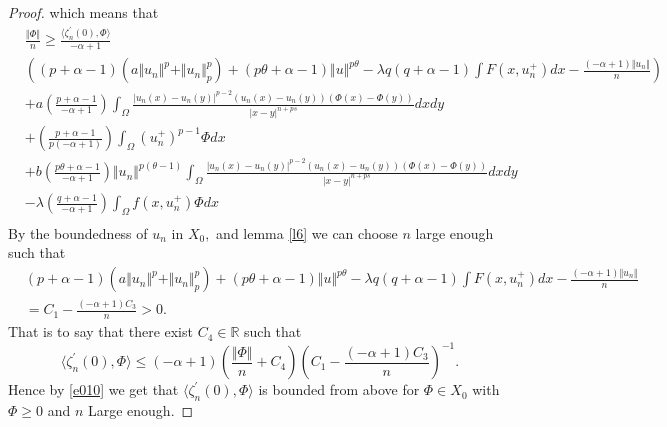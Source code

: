 \documentclass[10pt,a4paper]{amsart}
\begin{document}
\begin{proof}
{}
which means that
{\scriptsize
\begin{equation}
\begin{aligned}
&\frac{\Vert \Phi\Vert}{n} \geq \frac{\langle\zeta^{\prime}_n(0),\Phi \rangle}{-\alpha +1}\\
&\left( (p +\alpha -1)\left( a\Vert u_n\Vert^{p} +\Vert u_n\Vert^{p}_{p}\right) +(p\theta +\alpha -1)\Vert u\Vert^{p\theta} -\lambda q(q +\alpha -1)\int F(x,u_n^+)dx -\frac{(-\alpha +1)\Vert u_n\Vert}{n} \right)\\
& +a\left(\frac{p +\alpha -1}{-\alpha +1}\right)\int_{\Omega}\frac{\vert u_n(x) -u_n(y)\vert^{p-2}(u_n(x) -u_n(y))(\Phi(x) -\Phi(y))}{\vert x -y\vert^{n  +ps}}dxdy
\\
& +\left(\frac{p +\alpha -1}{p(-\alpha +1)}\right)\int_{\Omega}(u_n^+)^{p -1}\Phi dx\\
& +b\left( \frac{p\theta +\alpha -1}{-\alpha +1}\right)\Vert u_n\Vert^{p(\theta -1)}\int_{\Omega}\frac{\vert u_n(x) -u_n(y)\vert^{p-2}(u_n(x) -u_n(y))(\Phi(x) -\Phi(y))}{\vert x -y\vert^{n  +ps}}dxdy\\
& -\lambda\left(  \frac{q +\alpha -1}{-\alpha +1}\right)\int_{\Omega} f(x,u_n^+)\Phi dx\\
\end{aligned}
\end{equation}
}
By the boundedness of $ u_n$ in $ X_0,$ and lemma \ref{l6} we can choose $ n$ large enough such that
{\scriptsize
\begin{equation}\label{e010}
\begin{aligned}
&(p +\alpha -1)\left( a\Vert u_n\Vert^{p} +\Vert u_n\Vert^{p}_{p}\right) +(p\theta +\alpha -1)\Vert u\Vert^{p\theta} -\lambda q(q +\alpha -1)\int F(x,u_n^+)dx -\frac{(-\alpha +1)\Vert u_n\Vert}{n}\\
& = C_1 - \frac{(-\alpha +1)C_3}{n} >0.
\end{aligned}
\end{equation}
}
That is to say that there exist $ C_4 \in \mathbb{R}$  such that 
\begin{equation*}
\langle\zeta^{\prime}_n(0),\Phi \rangle \leq (-\alpha +1)\left( \frac{\Vert \Phi\Vert}{n} +C_4\right)\left( C_1 - \frac{(-\alpha +1)C_3}{n}\right)^{-1}.
\end{equation*}
Hence by \ref{e010} we get that  $ \langle\zeta^{\prime}_n(0),\Phi \rangle$ is bounded from above for $ \Phi\in X_0$ with $ \Phi \geq 0$ and $ n$ Large enough.
\end{proof}
\end{document}
